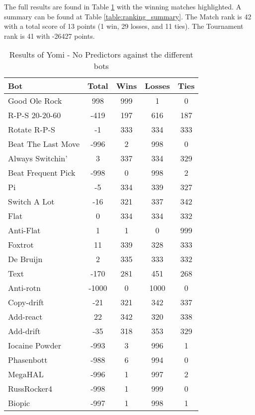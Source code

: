 The full results are found in Table \ref{table:JustYomi_results} with the winning matches highlighted. A summary can be found at Table \ref{table:ranking_summary}. The Match rank is 42 with a total score of 13 points (1 win, 29 losses, and 11 ties). The Tournament rank is 41 with -26427 points.

\begin{table}
    \caption{Results of Yomi - No Predictors against the different bots}
    \label{table:JustYomi_results}
    \centering
    \begin{tabular}{|l|c|c|c|c|}
        \hline
        \textbf{Bot} & \textbf{Total} & \textbf{Wins} & \textbf{Losses} & \textbf{Ties} \\ \hline
\rowcolor{HighlightRowColor} Good Ole Rock & 998 & 999 & 1 & 0 \\ \hline 
R-P-S 20-20-60 & -419 & 197 & 616 & 187 \\ \hline 
Rotate R-P-S & -1 & 333 & 334 & 333 \\ \hline 
Beat The Last Move & -996 & 2 & 998 & 0 \\ \hline 
Always Switchin' & 3 & 337 & 334 & 329 \\ \hline 
Beat Frequent Pick & -998 & 0 & 998 & 2 \\ \hline 
Pi & -5 & 334 & 339 & 327 \\ \hline 
Switch A Lot & -16 & 321 & 337 & 342 \\ \hline 
Flat & 0 & 334 & 334 & 332 \\ \hline 
Anti-Flat & 1 & 1 & 0 & 999 \\ \hline 
Foxtrot & 11 & 339 & 328 & 333 \\ \hline 
De Bruijn & 2 & 335 & 333 & 332 \\ \hline 
Text & -170 & 281 & 451 & 268 \\ \hline 
Anti-rotn & -1000 & 0 & 1000 & 0 \\ \hline 
Copy-drift & -21 & 321 & 342 & 337 \\ \hline 
Add-react & 22 & 342 & 320 & 338 \\ \hline 
Add-drift & -35 & 318 & 353 & 329 \\ \hline 
Iocaine Powder & -993 & 3 & 996 & 1 \\ \hline 
Phasenbott & -988 & 6 & 994 & 0 \\ \hline 
MegaHAL & -996 & 1 & 997 & 2 \\ \hline 
RussRocker4 & -998 & 1 & 999 & 0 \\ \hline 
Biopic & -997 & 1 & 998 & 1 \\ \hline 

\end{tabular}
\end{table}
